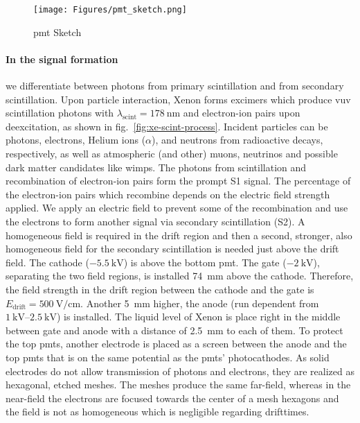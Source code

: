 \begin{figure}
\centering
\texttt{[image: Figures/pmt\_sketch.png]}  %
\caption[PMT Sketch]{
    \gls{pmt} Sketch
    }
\label{fig:pmt_sketch}
\end{figure}


\paragraph{In the signal formation} we differentiate between photons from primary scintillation and from secondary scintillation.
Upon particle interaction, Xenon forms excimers which produce \gls{vuv} scintillation photons with $ \lambda_\mathrm{scint} = \SI{178}{\nano\meter} $ and electron-ion pairs upon deexcitation, as shown in fig.~\ref{fig:xe-scint-process}.
Incident particles can be photons, electrons, Helium ions ($ \alpha $), and neutrons from radioactive decays, respectively, as well as atmospheric (and other) muons, neutrinos and possible dark matter candidates like \glspl{wimp}.
The photons from scintillation and recombination of electron-ion pairs form the prompt S1 signal.
The percentage of the electron-ion pairs which recombine depends on the electric field strength applied.
We apply an electric field to prevent some of the recombination and use the electrons to form another signal via secondary scintillation (S2).
A homogeneous field is required in the drift region and then a second, stronger, also homogeneous field for the secondary scintillation is needed just above the drift field.
The cathode ($ \SI{-5.5}{\kilo\volt} $) is above the bottom \gls{pmt}.
The gate ($ \SI{-2}{\kilo\volt} $), separating the two field regions, is installed \SI{74}{\milli\m} above the cathode.
Therefore, the field strength in the drift region between the cathode and the gate is $ E_\mathrm{drift} = \SI{500}{\volt\per\centi\m} $.
Another \SI{5}{\milli\m} higher, the anode (run dependent from $ \SIrange{1}{2.5}{\kilo\volt} $) is installed.
The liquid level of Xenon is place right in the middle between gate and anode with a distance of \SI{2.5}{\milli\m} to each of them.
To protect the top \glspl{pmt}, another electrode is placed as a screen between the anode and the top \glspl{pmt} that is on the same potential as the \glspl{pmt}' photocathodes.
As solid electrodes do not allow transmission of photons and electrons, they are realized as hexagonal, etched meshes.
The meshes produce the same far-field, whereas in the near-field the electrons are focused towards the center of a mesh hexagons and the field is not as homogeneous which is negligible regarding drifttimes.
